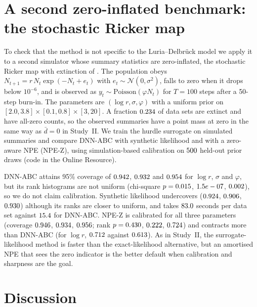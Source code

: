 \documentclass[sn-basic,iicol,pdflatex]{sn-jnl}
\begin{document}
\section{A second zero-inflated benchmark: the stochastic Ricker map}\label{sec:ricker}
To check that the method is not specific to the Luria--Delbr\"uck model we apply it to a second simulator whose summary statistics are zero-inflated, the stochastic Ricker map with extinction
of \citet{wood2010}. The population obeys $N_{t+1}=r\,N_t\exp(-N_t+e_t)$ with $e_t\sim\mathcal N(0,\sigma^2)$, falls to zero when it drops below $10^{-6}$, and is observed as
$y_t\sim\mathrm{Poisson}(\varphi N_t)$ for $T=100$ steps after a 50-step burn-in. The parameters are $(\log r,\sigma,\varphi)$ with a uniform prior on $[2.0,3.8]\times[0.1,0.8]\times[3,20]$.
A fraction $0.234$ of data sets are extinct and have all-zero counts, so the observed summaries have a point mass at zero in the same way as $\bar d=0$ in Study~II.
We train the hurdle surrogate on simulated summaries and compare DNN-ABC with synthetic likelihood \citep{wood2010,price2018} and with a zero-aware NPE (NPE-Z), using
simulation-based calibration on $500$ held-out prior draws (code in the Online Resource).

DNN-ABC attains 95\% coverage of $0.942$, $0.932$ and $0.954$ for $\log r$, $\sigma$ and $\varphi$, but its rank histograms are
not uniform (chi-square $p=0.015$, $1.5e-07$, $0.002$), so we do not claim calibration. Synthetic likelihood undercovers
($0.924$, $0.906$, $0.930$) although its ranks are closer to uniform, and takes $83.0$ seconds per data set against
$15.4$ for DNN-ABC. NPE-Z is calibrated for all three parameters (coverage $0.946$, $0.934$, $0.956$; rank
$p=0.430$, $0.222$, $0.724$) and contracts more than DNN-ABC (for $\log r$, $0.712$ against $0.613$). As in Study~II,
the surrogate-likelihood method is faster than the exact-likelihood alternative, but an amortised NPE that sees the zero indicator is the better default when calibration and sharpness are the goal.

\section{Discussion}
\label{sec:discussion}
\end{document}
